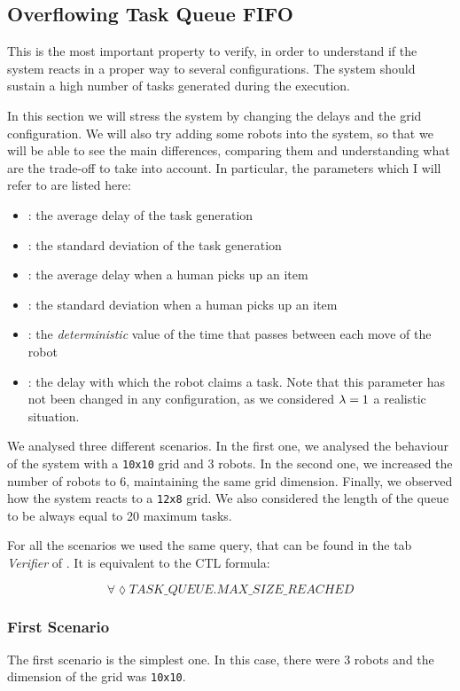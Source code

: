 \subsection{Overflowing Task Queue FIFO}
This is the most important property to verify, in order to understand if the system reacts in a proper way to several configurations. The system should sustain a high number of tasks generated during the execution.

In this section we will stress the system by changing the delays and the grid configuration. We will also try adding some robots into the system, so that we will be able to see the main differences, comparing them and understanding what are the trade-off to take into account. In particular, the parameters which I will refer to are listed here:
\begin{itemize}
    \item \mT: the average delay of the task generation
    \item \vT: the standard deviation of the task generation
    \item \mH: the average delay when a human picks up an item
    \item \vH: the standard deviation when a human picks up an item
    \item \K: the \emph{deterministic} value of the time that passes between each move of the robot
    \item \expdel: the delay with which the robot claims a task. Note that this parameter has not been changed in any configuration, as we considered $\lambda= 1$ a realistic situation.
\end{itemize}

We analysed three different scenarios. In the first one, we analysed the behaviour of the system with a \texttt{10x10} grid and 3 robots. In the second one, we increased the number of robots to 6, maintaining the same grid dimension. Finally, we observed how the system reacts to a \texttt{12x8} grid. We also considered the length of the queue to be always equal to 20 maximum tasks.

For all the scenarios we used the same query, that can be found in the tab \emph{Verifier} of \UPPAAL. It is equivalent to the CTL formula:

\begin{equation}
    \forall \lozenge TASK\_QUEUE.MAX\_SIZE\_REACHED
\end{equation}

\subsubsection{First Scenario} \label{firstscenario}
The first scenario is the simplest one. In this case, there were 3 robots and the dimension of the grid was \texttt{10x10}.

